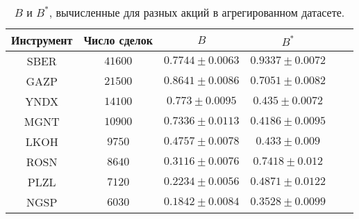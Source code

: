 \begin{table}[h!]
    \begin{center}
        \begin{tabular}{|c|c|c|c|c|c|}
            \hline
            Инструмент        & Число сделок & $B$ & $B^*$ \\ \hline
            SBER & $41600 $ & $ 0.7744 \pm 0.0063 $ & $ 0.9337 \pm 0.0072 $ \\ \hline
            GAZP & $21500 $ & $ 0.8641 \pm 0.0086 $ & $ 0.7051 \pm 0.0082 $ \\ \hline
            YNDX & $14100 $ & $ 0.773  \pm 0.0095 $ & $ 0.435  \pm 0.0072 $ \\ \hline
            MGNT & $10900 $ & $ 0.7336 \pm 0.0113 $ & $ 0.4186 \pm 0.0095 $ \\ \hline
            LKOH & $9750  $ & $ 0.4757 \pm 0.0078 $ & $ 0.433  \pm 0.009  $\\ \hline
            ROSN & $8640  $ & $ 0.3116 \pm 0.0076 $ & $ 0.7418 \pm 0.012  $\\ \hline
            PLZL & $7120  $ & $ 0.2234 \pm 0.0056 $ & $ 0.4871 \pm 0.0122 $ \\ \hline
            NGSP & $6030  $ & $ 0.1842 \pm 0.0084 $ & $ 0.3528 \pm 0.0099 $ \\ \hline
        \end{tabular}
    \end{center}
    \label{tableanal}
    \caption{$B$ и $B ^*$, вычисленные для разных акций в агрегированном датасете.}
    \end{table} 